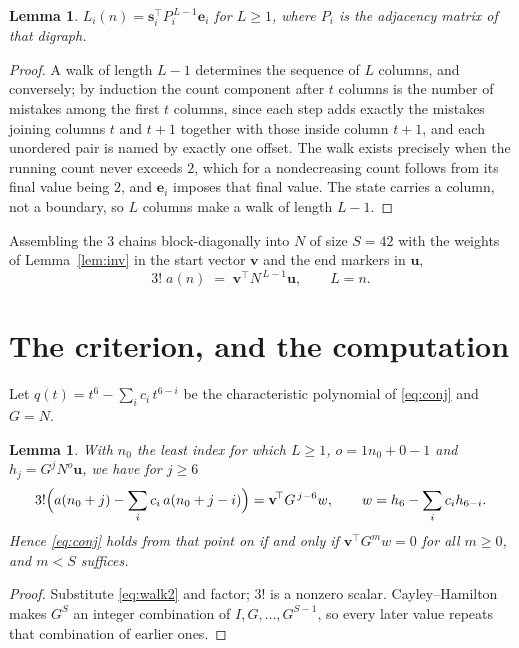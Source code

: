 \documentclass[11pt,a4paper]{article}
\theoremstyle{plain}
\newtheorem{lemma}[theorem]{Lemma}
\theoremstyle{definition}
\begin{document}
\begin{lemma}\label{lem:walk}
$L_i(n)=\mathbf{s}_i^{\!\top}P_i^{\,L-1}\mathbf{e}_i$ for $L\ge1$, where $P_i$ is the
adjacency matrix of that digraph.
\end{lemma}

\begin{proof}
A walk of length $L-1$ determines the sequence of $L$ columns, and conversely; by induction
the count component after $t$ columns is the number of mistakes among the first $t$ columns,
since each step adds exactly the mistakes joining columns $t$ and $t+1$ together with those
inside column $t+1$, and each unordered pair is named by exactly one offset. The walk exists
precisely when the running count never exceeds $2$, which for a nondecreasing count follows
from its final value being $2$, and $\mathbf{e}_i$ imposes that final value. The state
carries a column, not a boundary, so $L$ columns make a walk of length $L-1$.
\end{proof}

Assembling the $3$ chains block-diagonally into $N$ of size $S=42$ with the weights of
Lemma~\ref{lem:inv} in the start vector $\mathbf{v}$ and the end markers in
$\mathbf{u}$,
\begin{equation}\label{eq:walk2}
3!\;a(n)\;=\;\mathbf{v}^{\!\top}N^{\,L-1}\mathbf{u},\qquad L=n .
\end{equation}

\section{The criterion, and the computation}

Let $q(t)=t^{6}-\sum_i c_i\,t^{6-i}$ be the characteristic polynomial of
\eqref{eq:conj} and $G=N$.

\begin{lemma}\label{lem:crit}
With $n_0$ the least index for which $L\ge1$, $o=1n_0+0-1$ and
$h_j=G^{j}N^{o}\mathbf{u}$, we have for $j\ge6$
\[
3!\Bigl(a(n_0+j)-\sum_i c_i\,a(n_0+j-i)\Bigr)=\mathbf{v}^{\!\top}G^{\,j-6}w,
\qquad w=h_{6}-\sum_i c_ih_{6-i} .
\]
Hence \eqref{eq:conj} holds from that point on if and only if
$\mathbf{v}^{\!\top}G^{m}w=0$ for all $m\ge0$, and $m<S$ suffices.
\end{lemma}

\begin{proof}
Substitute \eqref{eq:walk2} and factor; $3!$ is a nonzero scalar. Cayley--Hamilton
makes $G^{S}$ an integer combination of $I,G,\dots,G^{S-1}$, so every later value repeats
that combination of earlier ones.
\end{proof}
\end{document}
